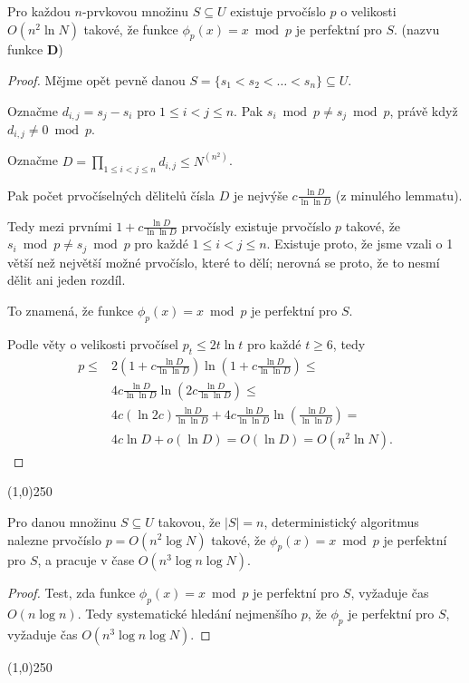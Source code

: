 \documentclass[a4paper,12pt]{article}
\newenvironment{myproof}{
  \begin{proof}
    
  }{
  \end{proof}
  \begin{center}
   \line(1,0){250}
   \end{center}
  }
\begin{document}
\begin{veta}Pro každou $n$-prvkovou množinu $S\subseteq 
U$ 
existuje prvo\-čís\-lo $p$ o velikosti $O(n^2\ln N)$ takové, že 
funkce $\phi_p(x)=x\bmod p$ je perfektní pro $S$. (nazvu funkce $\mathbf{D}$)  
\end{veta}

\begin{myproof}

Mějme opět pevně danou $S=\{s_1<s_2<\dots<s_n\}\subseteq U$. 

Označme 
$d_{i,j}=s_j-s_i$ pro $1\le i<j\le n$. Pak $s_i\bmod p\ne s_j\bmod 
p$, 
právě když $d_{i,j}\ne 0\bmod p$.

 Označme 
$D=\prod_{1\le i<j\le n}d_{i,j}\le N^{(n^2)}$. 

Pak počet prvočíselných 
dělitelů čísla $D$ je nejvýše $c\frac {\ln 
D}{\ln\ln D}$ (z minulého lemmatu).

Tedy mezi 
prvními $1+c\frac {\ln D}{\ln\ln D}$ prvočísly existuje prvočíslo $
p$ 
takové, že $s_i\bmod p\ne s_j\bmod p$ pro každé $1\le i
<j\le n$. Existuje proto, že jsme vzali o 1 větší než největší možné prvočíslo, které to dělí; nerovná se proto, že to nesmí dělit ani jeden rozdíl.


To znamená, že funkce $\phi_p(x)=x\bmod p$ je perfektní pro 
$S$. 


Podle věty o velikosti prvočísel $p_t\le 2t\ln t$ pro každé $
t\ge 6$, tedy
\begin{align*} p\le&2(1+c\frac {\ln D}{\ln\ln D})\ln(1+c\frac {\ln D}{\ln\ln 
D})\le\\
&4c\frac {\ln D}{\ln\ln D}\ln(2c\frac {\ln D}{\ln\ln D})\le\\
&4c(\ln2c)\frac {\ln D}{\ln\ln D}+4c\frac {\ln D}{\ln\ln D}\ln(\frac {\ln 
D}{\ln\ln D})=\\
&4c\ln D+o(\ln D)=O(\ln D)=O(n^2\ln N).\end{align*}


\end{myproof}



\begin{veta}Pro danou množinu $S\subseteq U$ takovou, že 
$|S|=n$, deterministický algoritmus nalezne prvočíslo 
$p=O(n^2\log N)$ takové, že $\phi_p(x)=x\bmod p$ je perfektní 
pro $S$, a pracuje v čase $O(n^3\log n\log N)$.\end{veta}

\begin{myproof}
Test, zda funkce $\phi_p(x)=x\bmod p$ je perfektní 
pro $S$, 
vyžaduje čas $O(n\log n)$. Tedy systematické hledání 
nejmenšího $p$, že $\phi_p$ je perfektní pro $S$, vyžaduje čas 
$O(n^3\log n\log N)$. 
\end{myproof}
\end{document}

